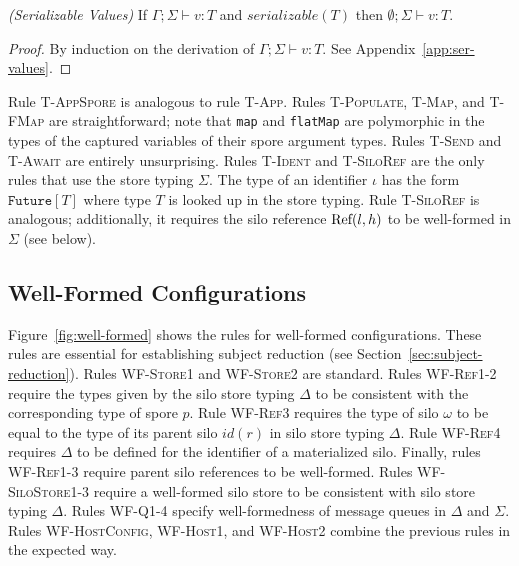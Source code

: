 \begin{thm}
\emph{(Serializable Values)}\label{lem:ser-values}
If $\Gamma ; \Sigma \vdash v : T$ and $serializable(T)$ then
$\emptyset ; \Sigma \vdash v : T$.
\end{thm}
\begin{proof}
By induction on the derivation of $\Gamma ; \Sigma \vdash v : T$. See
Appendix~\ref{app:ser-values}.
\end{proof}

Rule \textsc{T-AppSpore} is analogous to rule \textsc{T-App}. Rules
\textsc{T-Populate}, \textsc{T-Map}, and \textsc{T-FMap} are
straightforward; note that \verb|map| and \verb|flatMap| are
polymorphic in the types of the captured variables of their spore
argument types. Rules \textsc{T-Send} and \textsc{T-Await} are
entirely unsurprising. Rules \textsc{T-Ident} and \textsc{T-SiloRef}
are the only rules that use the store typing $\Sigma$. The type of an
identifier $\iota$ has the form $\texttt{Future}[T]$ where type $T$ is
looked up in the store typing. Rule \textsc{T-SiloRef} is analogous;
additionally, it requires the silo reference ${\textrm{Ref}(l, h)}$ to be
well-formed in $\Sigma$ (see below).

\subsection{Well-Formed Configurations}

Figure~\ref{fig:well-formed} shows the rules for well-formed
configurations. These rules are essential for establishing subject
reduction (see Section~\ref{sec:subject-reduction}). Rules
\textsc{WF-Store1} and \textsc{WF-Store2} are standard.  Rules
\textsc{WF-Ref1-2} require the types given by the silo store typing
$\Delta$ to be consistent with the corresponding type of spore
$p$. Rule \textsc{WF-Ref3} requires the type of silo $\omega$ to be
equal to the type of its parent silo $id(r)$ in silo store typing
$\Delta$. Rule \textsc{WF-Ref4} requires $\Delta$ to be defined for
the identifier of a materialized silo. Finally, rules
\textsc{WF-Ref1-3} require parent silo references to be well-formed.
Rules \textsc{WF-SiloStore1-3} require a well-formed silo store to be
consistent with silo store typing $\Delta$. Rules \textsc{WF-Q1-4}
specify well-formedness of message queues in $\Delta$ and $\Sigma$.
Rules \textsc{WF-HostConfig}, \textsc{WF-Host1}, and \textsc{WF-Host2}
combine the previous rules in the expected way.

